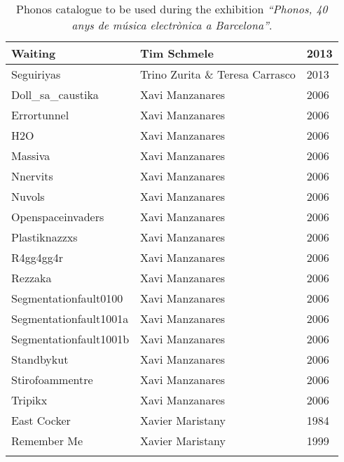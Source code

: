 \begin{center}
\begin{longtable}{ p{}  p{}  p{} }
Waiting & Tim Schmele & 2013 \\ \midrule 
Seguiriyas & Trino Zurita \& Teresa Carrasco & 2013 \\ \midrule 
Doll\_sa\_caustika & Xavi Manzanares & 2006 \\ \midrule 
Errortunnel & Xavi Manzanares & 2006 \\ \midrule 
H2O & Xavi Manzanares & 2006 \\ \midrule 
Massiva & Xavi Manzanares & 2006 \\ \midrule 
Nnervits & Xavi Manzanares & 2006 \\ \midrule 
Nuvols & Xavi Manzanares & 2006 \\ \midrule 
Openspaceinvaders & Xavi Manzanares & 2006 \\ \midrule 
Plastiknazzxs & Xavi Manzanares & 2006 \\ \midrule 
R4gg4gg4r & Xavi Manzanares & 2006 \\ \midrule 
Rezzaka & Xavi Manzanares & 2006 \\ \midrule 
Segmentationfault0100 & Xavi Manzanares & 2006 \\ \midrule 
Segmentationfault1001a & Xavi Manzanares & 2006 \\ \midrule 
Segmentationfault1001b & Xavi Manzanares & 2006 \\ \midrule 
Standbykut & Xavi Manzanares & 2006 \\ \midrule 
Stirofoammentre & Xavi Manzanares & 2006 \\ \midrule 
Tripikx & Xavi Manzanares & 2006 \\ \midrule 
East Cocker & Xavier Maristany & 1984 \\ \midrule 
Remember Me & Xavier Maristany & 1999 \\ \bottomrule 
\caption[Phonos catalogue of songs]{Phonos catalogue to be used during the exhibition \textit{``Phonos, 40 anys de música electrònica a Barcelona''}.}
\label{table:phonosCatalogue}
\end{longtable}
\end{center}